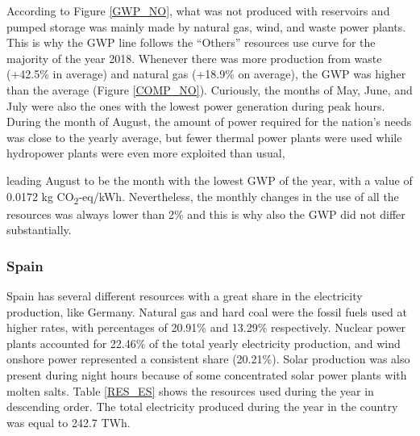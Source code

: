 { According to Figure \ref{GWP_NO}, what was not produced with reservoirs and pumped storage was mainly  made by natural gas, wind, and waste power plants. This is why the GWP line follows the ``Others'' resources use curve for the majority of the year 2018. Whenever there was more production from waste {(+42.5\% in average)} and natural gas {(+18.9\% on average)}, the GWP was higher than the average (Figure \ref{COMP_NO}). {Curiously, the months of May, June, and July were also the ones with the lowest power generation during peak hours.} During the month of August, the amount of power required for the nation's needs was close to the yearly average, but fewer thermal power plants were used while hydropower plants were even more exploited than usual, {leading August to be the month with the lowest GWP of the year, with a value of 0.0172 kg CO\textsubscript2-eq/kWh. %
 Nevertheless, the monthly changes in the use of all the resources was always lower than 2\% and this is why also the GWP did not differ substantially. 

\subsubsection{Spain}

Spain has several different resources with a great share in the electricity production, like Germany.
 Natural gas and hard coal were the fossil fuels used at higher rates, with percentages of 20.91\% and 13.29\% respectively. Nuclear power plants accounted for 22.46\% of the total yearly electricity production, and  wind onshore power represented a consistent share (20.21\%).  Solar production was also present  during night hours because of some concentrated solar power plants with molten salts. Table \ref{RES_ES} shows the resources used during the year in descending order. The total electricity produced during the year in the country was equal to 242.7 TWh.

}}
